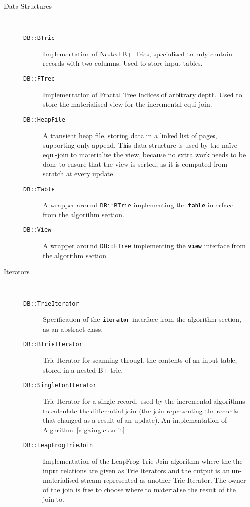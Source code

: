 \begin{description}
  \item[Data Structures]~\\
    \begin{description}
      \item[\textnormal{\texttt{DB::BTrie}}] Implementation of Nested B+-Tries, specialised to only contain records with two columns. Used to store input tables.
      \item[\textnormal{\texttt{DB::FTree}}] Implementation of Fractal Tree Indices of arbitrary depth. Used to store the materialised view for the incremental equi-join.
      \item[\textnormal{\texttt{DB::HeapFile}}] A transient heap file, storing data in a linked list of pages, supporting only append. This data structure is used by the na\"ive equi-join to materialise the view, because no extra work needs to be done to ensure that the view is sorted, as it is computed from scratch at every update.
      \item[\textnormal{\texttt{DB::Table}}] A wrapper around \texttt{DB::BTrie} implementing the \texttt{\textbf{table}} interface from the algorithm section.
      \item[\textnormal{\texttt{DB::View}}] A wrapper around \texttt{DB::FTree} implementing the \texttt{\textbf{view}} interface from the algorithm section.
    \end{description}
  \item[Iterators]~\\
    \begin{description}
      \item[\textnormal{\texttt{DB::TrieIterator}}] Specification of the \texttt{\textbf{iterator}} interface from the algorithm section, as an abstract class.
      \item[\textnormal{\texttt{DB::BTrieIterator}}] Trie Iterator for scanning through the contents of an input table, stored in a nested B+-trie.
      \item[\textnormal{\texttt{DB::SingletonIterator}}] Trie Iterator for a single record, used by the incremental algorithms to calculate the differential join (the join representing the records that changed as a result of an update). An implementation of Algorithm~\ref{alg:singleton-it}.
      \item[\textnormal{\texttt{DB::LeapFrogTrieJoin}}] Implementation of the LeapFrog Trie-Join algorithm where the the input relations are given as Trie Iterators and the output is an un-materialised stream represented as another Trie Iterator. The owner of the join is free to choose where to materialise the result of the join to.

\end{description}
\end{description}
